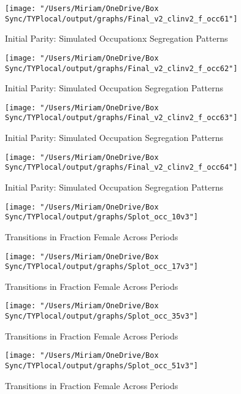 \documentclass[12pt]{article}
\begin{document}
\begin{center}
\begin{figure}[H]
\centering
\caption{Initial Parity: Simulated Occupationx Segregation Patterns}
\label{fig:ip1}
\texttt{[image: "/Users/Miriam/OneDrive/Box Sync/TYPlocal/output/graphs/Final\_v2\_clinv2\_f\_occ61"]}
\end{figure}
\begin{figure}[H]
\centering
\caption{Initial Parity: Simulated Occupation Segregation Patterns}
\label{fig:ip2}
\texttt{[image: "/Users/Miriam/OneDrive/Box Sync/TYPlocal/output/graphs/Final\_v2\_clinv2\_f\_occ62"]}
\end{figure}
\begin{figure}[H]
\centering
\caption{Initial Parity: Simulated Occupation Segregation Patterns}
\label{fig:ip3}
\texttt{[image: "/Users/Miriam/OneDrive/Box Sync/TYPlocal/output/graphs/Final\_v2\_clinv2\_f\_occ63"]}
\end{figure}
\begin{figure}[H]
\centering
\caption{Initial Parity: Simulated Occupation Segregation Patterns}
\label{fig:ip4}
\texttt{[image: "/Users/Miriam/OneDrive/Box Sync/TYPlocal/output/graphs/Final\_v2\_clinv2\_f\_occ64"]}
\end{figure}
\end{center}


\begin{figure}[H]
\centering
\caption{Transitions in Fraction Female Across Periods}
\label{transitions10}
\texttt{[image: "/Users/Miriam/OneDrive/Box Sync/TYPlocal/output/graphs/Splot\_occ\_10v3"]}
\end{figure}

\begin{figure}[H]
\centering
\caption{Transitions in Fraction Female Across Periods}
\label{transitions17}
\texttt{[image: "/Users/Miriam/OneDrive/Box Sync/TYPlocal/output/graphs/Splot\_occ\_17v3"]}
\end{figure}

\begin{figure}[H]
\centering
\caption{Transitions in Fraction Female Across Periods}
\label{transitions35}
\texttt{[image: "/Users/Miriam/OneDrive/Box Sync/TYPlocal/output/graphs/Splot\_occ\_35v3"]}
\end{figure}

\begin{figure}[H]
\centering
\caption{Transitions in Fraction Female Across Periods}
\label{transitions51}
\texttt{[image: "/Users/Miriam/OneDrive/Box Sync/TYPlocal/output/graphs/Splot\_occ\_51v3"]}
\end{figure}
\end{document}
